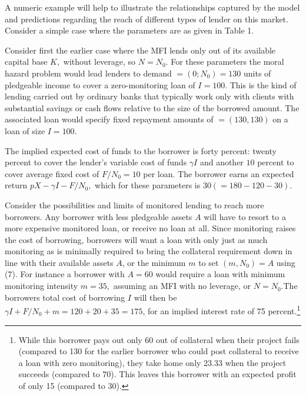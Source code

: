 \documentclass[letterpaper, 12pt]{article}
\begin{document}
A numeric example will help to illustrate the relationships captured by
the model and predictions regarding the reach of different types of
lender on this market. Consider a simple case where the parameters are
as given in Table 1.

Consider first the earlier case where the MFI lends only out of its
available capital base \(K,\) without leverage, so \(N = N_{0}\). For
these parameters the moral hazard problem would lead lenders to demand
\(= (0;N_{0}) = 130\) units of pledgeable income to cover a
zero-monitoring loan of \(I = 100\). This is the kind of lending carried
out by ordinary banks that typically work only with clients with
substantial savings or cash flows relative to the size of the borrowed
amount. The associated loan would specify fixed repayment amounts of
\(= (130,130)\) on a loan of size \(I = 100.\)

The implied expected cost of funds to the borrower is forty percent:
twenty percent to cover the lender's variable cost of funds
$\gamma I$ and another \(10\) percent to cover average fixed cost of
\(F/N_{0} = 10\) per loan. The borrower earns an expected return
\(pX - \gamma I - F/N_{0},\) which for these parameters is
\(30( = 180 - 120 - 30).\)

Consider the possibilities and limits of monitored lending to reach more
borrowers. Any borrower with less pledgeable assets \(A\) will have to
resort to a more expensive monitored loan, or receive no loan at all.
Since monitoring raises the cost of borrowing, borrowers will want a
loan with only just as much monitoring as is minimally required to bring
the collateral requirement down in line with their available assets
\(A\), or the minimum \(m\) to set \((m,N_{0}) = A\) using (7). For
instance a borrower with \(A = 60\) would require a loan with minimum
monitoring intensity \(m = 35,\) assuming an MFI with no leverage, or
\(N = N_{0}\).The borrowers total cost of borrowing \(I\) will then be
\(\gamma I + F/N_{0} + m = 120 + 20 + 35 = 175\), for an implied
interest rate of 75 percent.\footnote{While this borrower pays out only
  60 out of collateral when their project fails (compared to 130 for the
  earlier borrower who could post collateral to receive a loan with zero
  monitoring), they take home only 23.33 when the project succeeds
  (compared to 70). This leaves this borrower with an expected profit of
  only 15 (compared to 30).}
\end{document}
